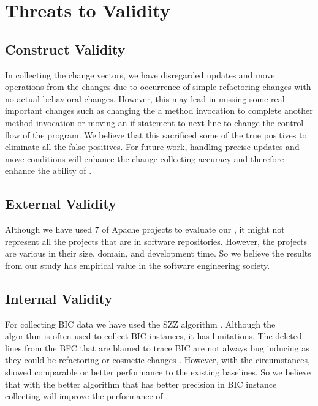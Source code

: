 \section{Threats to Validity}

\subsection{Construct Validity}
In collecting the change vectors, we have disregarded updates and move operations from the changes due to occurrence of simple refactoring changes with no actual behavioral changes.
However, this may lead in missing some real important changes such as changing the a method invocation to complete another method invocation or moving an if statement to next line to change the control flow of the program.
We believe that this sacrificed some of the true positives to eliminate all the false positives.
For future work, handling precise updates and move conditions will enhance the change collecting accuracy and therefore enhance the ability of {\simfinmo}.

\subsection{External Validity}
Although we have used 7 of Apache projects to evaluate our {\simfinmo}, it might not represent all the projects that are in software repositories.
However, the projects are various in their size, domain, and development time.
So we believe the results from our study has empirical value in the software engineering society.

\subsection{Internal Validity}
For collecting BIC data we have used the SZZ algorithm \cite{sliwerski2005changes}.
Although the algorithm is often used to collect BIC instances, it has limitations.
The deleted lines from the BFC that are blamed to trace BIC are not always bug inducing as they could be refactoring or cosmetic changes \cite{neto2018impact}.
However, with the circumstances, {\simfinmo} showed comparable or better performance to the existing baselines.
So we believe that with the better algorithm that has better precision in BIC instance collecting will improve the performance of {\simfinmo}.


